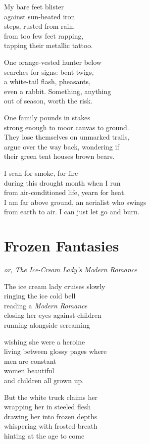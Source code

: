 \documentclass[twoside,10pt]{book}
\begin{document}
My bare feet blister\\
against sun-heated iron\\
steps, rusted from rain,\\
from too few feet rapping,\\
tapping their metallic tattoo.

One orange-vested hunter below\\
searches for signs: bent twigs,\\
a white-tail flash, pheasants,\\
even a rabbit. Something, anything\\
out of season, worth the risk.

One family pounds in stakes\\
strong enough to moor canvas to ground.\\
They lose themselves on unmarked trails,\\
argue over the way back, wondering if\\
their green tent houses brown bears.

I scan for smoke, for fire\\
during this drought month when I run\\
from air-conditioned life, yearn for heat.\\
I am far above ground, an aerialist who swings\\
from earth to air. I can just let go and burn.


\clearpage
\section{Frozen Fantasies}

\emph{or, The Ice-Cream Lady's Modern Romance}

The ice cream lady cruises slowly\\
ringing the ice cold bell\\
reading a \emph{Modern Romance}\\
closing her eyes against children\\
running alongside screaming

wishing she were a heroine\\
living between glossy pages where\\
men are constant\\
women beautiful\\
and children all grown up.

But the white truck claims her\\
wrapping her in steeled flesh\\
drawing her into frozen depths\\
whispering with frosted breath\\
hinting at the age to come
\end{document}
